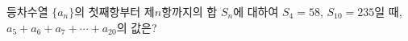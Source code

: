 등차수열 $\{a_n\}$의 첫째항부터 제$n$항까지의 합 $S_n$에 대하여 $S_4=58$, $S_{10}=235$일 때, $a_5+a_6+a_7+\cdots+a_{20}$의 값은?
